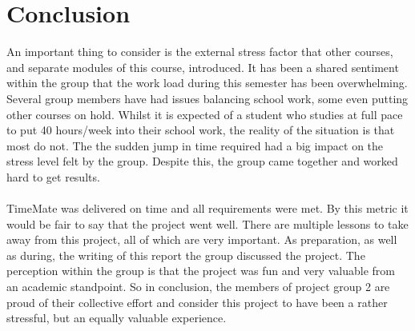 \documentclass{article}
\begin{document}
\section{Conclusion \label{conclusion}}
    An important thing to consider is the external stress factor that other courses, and separate
    modules of this course, introduced. It has been a shared sentiment within the group that the 
    work load during this semester has been overwhelming. Several group members have had issues 
    balancing school work, some even putting other courses on hold. Whilst it is expected of a 
    student who studies at full pace to put 40 hours/week into their school work, the reality 
    of the situation is that most do not. The the sudden jump in time required had a big impact 
    on the stress level felt by the group. Despite this, the group came together and worked hard to get results.
    \\ \\
    TimeMate was delivered on time and all requirements were met. By this metric it would be
    fair to say that the project went well. There are multiple lessons to take away from this project, all of which are very important.
    As preparation, as well as during, the writing of this report the group discussed the project. The perception within the group is
    that the project was fun and very valuable from an academic standpoint. So in conclusion, the members of project group 2 are proud of
    their collective effort and consider this project to have been a rather stressful, but an equally valuable experience.
    
\newpage
\end{document}
